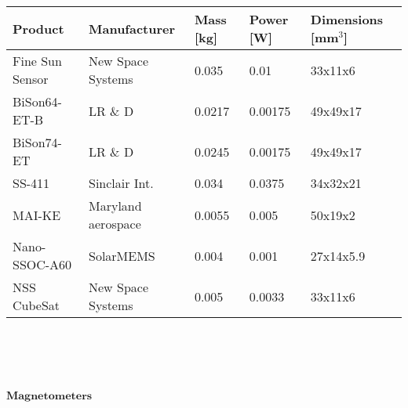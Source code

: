  
 \begin{tabular}{p{3cm}p{3cm}p{2cm}p{2cm}p{2cm}} \toprule
 	Product & Manufacturer & Mass [kg] & Power [W]& Dimensions [mm$^{3}$]\\ \midrule
 	
 		Fine Sun Sensor & New Space Systems & 0.035 & 0.01 & 33x11x6 \\
 		
 		BiSon64-ET-B & LR \& D & 0.0217 & 0.00175 & 49x49x17 \\
 		
 		BiSon74-ET & LR \& D  & 0.0245 & 0.00175 & 49x49x17  \\
 		
 		SS-411 & Sinclair Int. & 0.034 & 0.0375 & 34x32x21 \\
 	
 		MAI-KE & Maryland aerospace & 0.0055 & 0.005 & 50x19x2 \\
 		
 		Nano-SSOC-A60 & SolarMEMS & 0.004 & 0.001 & 27x14x5.9 \\
 		
 		NSS CubeSat & New Space Systems & 0.005 & 0.0033 & 33x11x6  \\ \bottomrule
 		
 \end{tabular}\\ \\ \\ \\
       
       
      
  $\textbf{Magnetometers}$\\
     
      
      

